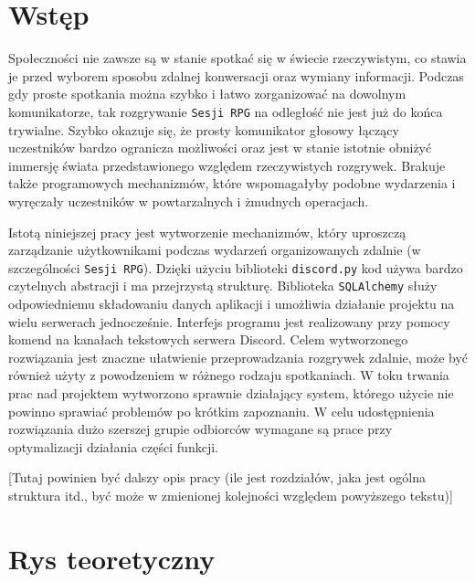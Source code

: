 \documentclass[shortabstract,inz]{iithesis}
\author{Mateusz Zając}
\begin{document}
	\chapter*{Wstęp}
		Społeczności nie zawsze są w stanie spotkać się w świecie rzeczywistym, co stawia je przed wyborem sposobu zdalnej konwersacji oraz wymiany informacji. Podczas gdy proste spotkania można szybko i łatwo zorganizować na dowolnym komunikatorze, tak rozgrywanie \texttt{Sesji RPG}\cite{sesjarpg} na odległość nie jest już do końca trywialne. Szybko okazuje się, że prosty komunikator głosowy łączący uczestników bardzo ogranicza możliwości oraz jest w stanie istotnie obniżyć immersję świata przedstawionego względem rzeczywistych rozgrywek. Brakuje także programowych mechanizmów, które wspomagałyby podobne wydarzenia i wyręczały uczestników w powtarzalnych i żmudnych operacjach. 

		Istotą niniejszej pracy jest wytworzenie mechanizmów, który uproszczą zarządzanie użytkownikami podczas wydarzeń organizowanych zdalnie (w szczególności \texttt{Sesji RPG}). Dzięki użyciu biblioteki \texttt{discord.py} kod używa bardzo czytelnych abstracji i ma przejrzystą strukturę. Biblioteka \texttt{SQLAlchemy} służy odpowiedniemu składowaniu danych aplikacji i umożliwia działanie projektu na wielu serwerach jednocześnie. Interfejs programu jest realizowany przy pomocy komend na kanałach tekstowych serwera Discord. Celem wytworzonego rozwiązania jest znaczne ułatwienie przeprowadzania rozgrywek zdalnie, może być również użyty z powodzeniem w różnego rodzaju spotkaniach. W toku trwania prac nad projektem wytworzono sprawnie działający system, którego użycie nie powinno sprawiać problemów po krótkim zapoznaniu. W celu udostępnienia rozwiązania dużo szerszej grupie odbiorców wymagane są prace przy optymalizacji działania części funkcji.
		
		[Tutaj powinien być dalszy opis pracy (ile jest rozdziałów, jaka jest ogólna struktura itd., być może w zmienionej kolejności względem powyższego tekstu)]
		
	\chapter{Rys teoretyczny}
\end{document}
